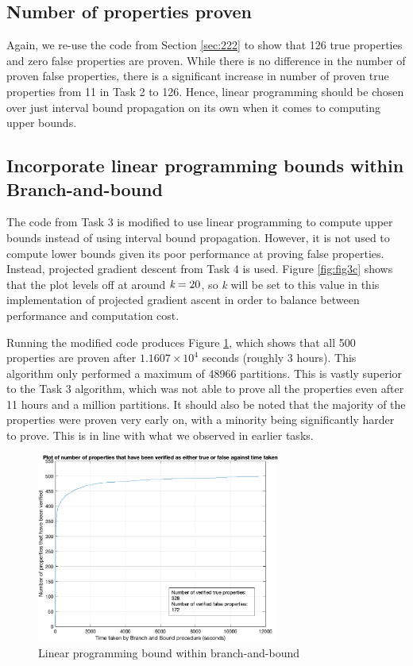 \documentclass[11pt]{article}
\begin{document}
\subsection{Number of properties proven}
Again, we re-use the code from Section \ref{sec:222} to show that 126 true properties and zero false properties are proven. While there is no difference in the number of proven false properties, there is a significant increase in number of proven true properties from 11 in Task 2 to 126. Hence, linear programming should be chosen over just interval bound propagation on its own when it comes to computing upper bounds.

\subsection{Incorporate linear programming bounds within Branch-and-bound}
\label{sec:5.3}

The code from Task 3 is modified to use linear programming to compute upper bounds instead of using interval bound propagation. However, it is not used to compute lower bounds given its poor performance at proving false properties. Instead, projected gradient descent from Task 4 is used. Figure \ref{fig:fig3c} shows that the plot levels off at around $\emph{k}=20$, so \emph{k} will be set to this value in this implementation of projected gradient ascent in order to balance between performance and computation cost. 

Running the modified code produces Figure \ref{fig:fig5}, which shows that all 500 properties are proven after $1.1607\times10^4$ seconds (roughly 3 hours). This algorithm only performed a maximum of 48966 partitions. This is vastly superior to the Task 3 algorithm, which was not able to prove all the properties even after 11 hours and a million partitions. It should also be noted that the majority of the properties were proven very early on, with a minority being significantly harder to prove. This is in line with what we observed in earlier tasks.



\begin{figure}[h]
	\centering
    \includegraphics[width=8cm]{Task 5 bnb.png}
	\caption{Linear programming bound within branch-and-bound}
	\label{fig:fig5}
\end{figure}
\end{document}
